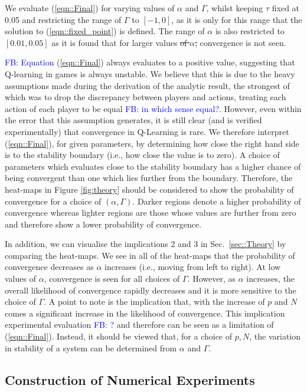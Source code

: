 \documentclass[sigconf]{aamas}
\newcommand\fb[1]{\textcolor{blue}{FB: #1}}
\begin{document}
We evaluate (\ref{eqn::Final}) for varying values of $\alpha$ and $\Gamma$, whilst keeping $\tau$ fixed at 0.05 and restricting the range of $\Gamma$ to $[-1, 0]$, as it is only for this range that the solution to (\ref{eqn::fixed_point}) is defined. The range of $\alpha$ is also restricted to $[0.01, 0.05]$ as it is found that for larger values \st{of $\alpha$,} convergence is not seen. 

\fb{Equation} (\ref{eqn::Final}) always evaluates to a positive value, suggesting that Q-learning in games is always unstable. We believe that this is due to the heavy assumptions made during the derivation of the analytic result, the strongest of which was to drop the discrepancy between players and actions, treating each action of each player to be equal \fb{in which sense equal?}. However, even within the error that this assumption generates, it is still clear (and is verified experimentally) that convergence in Q-Learning is rare. We therefore interpret (\ref{eqn::Final}), for given parameters, by determining how close the right hand side is to the stability boundary (i.e., how close the value is to zero). A choice of parameters which evaluates close to the stability boundary has a higher chance of being convergent than one which lies further from the boundary. Therefore, the heat-maps in Figure \ref{fig:theory} should be considered to show the probability of convergence for a choice of $(\alpha, \Gamma)$. Darker regions denote a higher probability of convergence whereas lighter regions are those whose values are further from zero and therefore show a lower probability of convergence.

In addition, we can visualise the implications 2 and 3 in Sec.~\ref{sec::Theory} by comparing the heat-maps. We see in all of the heat-maps that the probability of convergence decreases as $\alpha$ increases (i.e., moving from left to right). At low values of $\alpha$, convergence is seen for all choices of $\Gamma$. However, as $\alpha$ increases, the overall likelihood of convergence rapidly decreases and 
it is more sensitive to the choice of $\Gamma$. A point to note is the implication that, with the increase of $p$ and $N$ comes a significant increase in the likelihood of convergence. This implication experimental evaluation \fb{?} and therefore can be seen as a limitation of (\ref{eqn::Final}). Instead, it should be viewed that, for a choice of $p, N$, the variation in stability of a system can be determined from $\alpha$ and $\Gamma$.

\subsection{Construction of Numerical Experiments}
\end{document}
